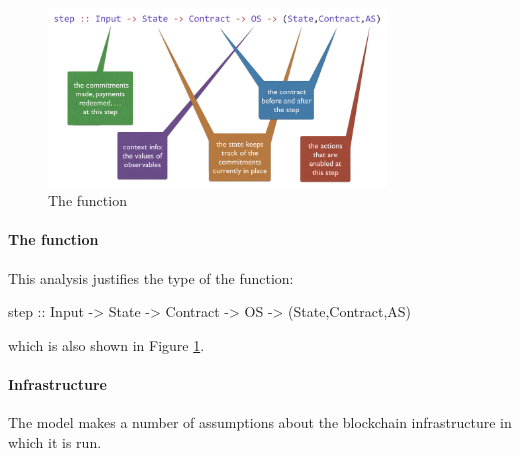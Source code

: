 \documentclass[
      acmsmall
    , screen
    , review=true
  ]{acmart}
\begin{document}
\begin{figure}[t]
\begin{center}
\includegraphics[width=0.8\textwidth]{pix/step-type.png}
\caption{The  function}
\label{fig:step-function}
\end{center}
\end{figure}

\paragraph{The  function}


This analysis justifies the type of the  function:

\begin{haskellcode}
step :: Input -> State -> Contract -> OS -> (State,Contract,AS)
\end{haskellcode}

which is also shown in Figure \ref{fig:step-function}.

\paragraph{Infrastructure}

The model makes a number of assumptions about the blockchain infrastructure in which it is run.
\end{document}
